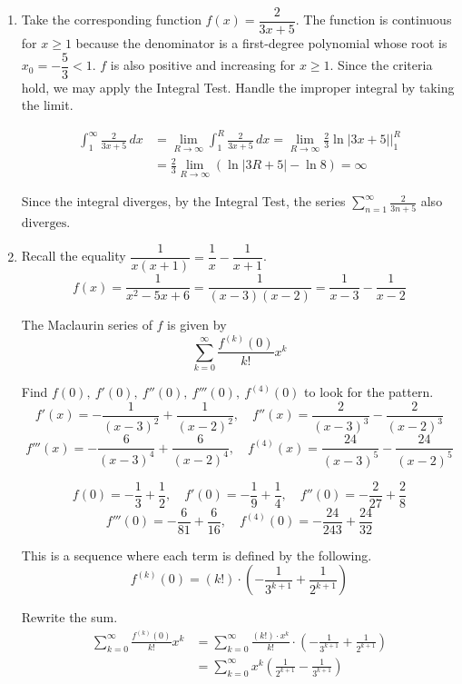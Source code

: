 \documentclass[a4paper, 12pt]{article}
\begin{document}
\begin{enumerate}[leftmargin=*,label=\textbf{\arabic*.}]
\item Take the corresponding function $f(x)=\dfrac2{3x+5}$. The function is continuous for $x\geq1$ because the denominator is a first-degree polynomial whose root is $x_0=-\dfrac53<1$. $f$ is also positive and increasing for $x\geq1$. Since the criteria hold, we may apply the Integral Test. Handle the improper integral by taking the limit.

\begin{align*}\int_1^{\infty}\frac{2}{3x+5}\,dx&=\lim_{R\to\infty}\int_1^R\frac{2}{3x+5}\,dx=\lim_{R\to\infty}\frac23\ln|3x+5|\bigg|_1^R\\[1em]&=\frac23\lim_{R\to\infty}\left(\ln|3R+5|-\ln8\right)=\infty\end{align*}

Since the integral diverges, by the Integral Test, the series $\displaystyle\sum_{n=1}^{\infty}\frac2{3n+5}$ also $\boxed{\text{diverges}}$.

\item Recall the equality $\dfrac1{x(x+1)}=\dfrac1{x}-\dfrac1{x+1}$.
\[f(x)=\frac1{x^2-5x+6}=\frac1{(x-3)(x-2)}=\frac1{x-3}-\frac1{x-2}\]

The Maclaurin series of $f$ is given by
\[\sum_{k=0}^{\infty}\frac{f^{(k)}(0)}{k!}x^k\]

Find $f(0),\:f'(0),\:f''(0),\:f'''(0),\:f^{(4)}(0)$ to look for the pattern.
\[f'(x)=-\frac1{(x-3)^2}+\frac1{(x-2)^2},\quad f''(x)=\frac2{(x-3)^3}-\frac2{(x-2)^3}\]
\[f'''(x)=-\frac6{(x-3)^4}+\frac6{(x-2)^4},\quad f^{(4)}(x)=\frac{24}{(x-3)^5}-\frac{24}{(x-2)^5}\]

\[f(0)=-\frac13+\frac12,\quad f'(0)=-\frac19+\frac14,\quad f''(0)=-\frac2{27}+\frac28\]
\[f'''(0)=-\frac6{81}+\frac6{16},\quad f^{(4)}(0)=-\frac{24}{243}+\frac{24}{32}\]

This is a sequence where each term is defined by the following.
\[f^{(k)}(0)=(k!)\cdot\left(-\frac1{3^{k+1}}+\frac1{2^{k+1}}\right)\]

Rewrite the sum.
\begin{align*}\sum_{k=0}^{\infty}\frac{f^{(k)}(0)}{k!}x^k&=\sum_{k=0}^{\infty}\frac{(k!)\cdot x^k}{k!}\cdot\left(-\frac1{3^{k+1}}+\frac1{2^{k+1}}\right)\\[1em]&=\boxed{\sum_{k=0}^{\infty}x^k\left(\frac1{2^{k+1}}-\frac1{3^{k+1}}\right)}\end{align*}

\end{enumerate}
\end{document}
